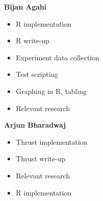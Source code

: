 \documentclass[titlepage, 11pt]{article}
\begin{document}
\textbf{Bijan Agahi}
\begin{itemize}
	\item R implementation
	\item R write-up
	\item Experiment data collection
	\item Test scripting
	\item Graphing in R, tabling
	\item Relevant research
\end{itemize}

\textbf{Arjun Bharadwaj}
\begin{itemize}
	\item Thrust implementation
	\item Thrust write-up
	\item Relevant research
	\item R implementation
\end{itemize}
\end{document}
